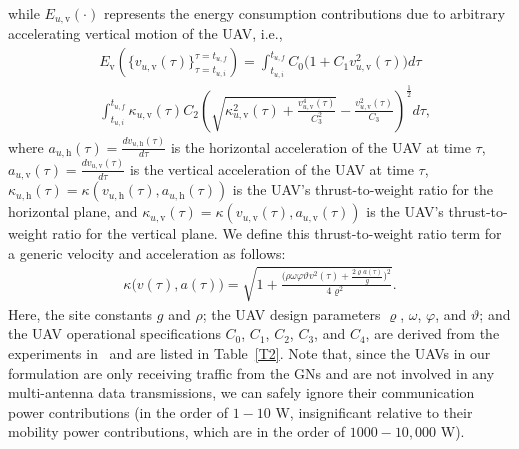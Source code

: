 \documentclass[10pt, twocolumn]{IEEEtran}
\begin{document}
while $E_{u,\mathrm{v}}({\cdot})$ represents the energy consumption contributions due to arbitrary accelerating vertical motion of the UAV, i.e.,
\begin{align}\label{Vertical_energy}
    &E_{\mathrm{v}}\left(\Big\{v_{u,\mathrm{v}}(\tau)\Big\}_{\tau{=}t_{u,i}}^{\tau{=}t_{u,f}}\right){=}\int_{t_{u,i}}^{t_{u,f}}C_{0}\Big(1 + C_{1}v_{u,\mathrm{v}}^{2}(\tau)\Big)d\tau\\&\int_{t_{u,i}}^{t_{u,f}}\kappa_{u,\mathrm{v}}(\tau)C_{2}\left(\sqrt{\kappa_{u,\mathrm{v}}^{2}(\tau){+}\frac{v_{u,\mathrm{v}}^{4}(\tau)}{C_{3}^{2}}}{-}\frac{v_{u,\mathrm{v}}^{2}(\tau)}{C_{3}}\right)^{\frac{1}{2}}d\tau\nonumber,
\end{align}
where $a_{u,\mathrm{h}}(\tau){=}\frac{dv_{u,\mathrm{h}}(\tau)}{d\tau}$ is the horizontal acceleration of the UAV at time $\tau$, $a_{u,\mathrm{v}}(\tau){=}\frac{dv_{u,\mathrm{v}}(\tau)}{d\tau}$ is the vertical acceleration of the UAV at time $\tau$, $\kappa_{u,\mathrm{h}}(\tau){=}\kappa\left(v_{u,\mathrm{h}}(\tau),a_{u,\mathrm{h}}(\tau)\right)$ is the UAV's thrust-to-weight ratio for the horizontal plane, and $\kappa_{u,\mathrm{v}}(\tau){=}\kappa\left(v_{u,\mathrm{v}}(\tau),a_{u,\mathrm{v}}(\tau)\right)$ is the UAV's thrust-to-weight ratio for the vertical plane. We define this thrust-to-weight ratio term for a generic velocity and acceleration as follows:
\vspace{1.319mm}
\begin{align}\label{Kappa_term}
    \kappa\Big(v(\tau),a(\tau)\Big) = \sqrt{1 + \frac{\Big(\rho\omega\varphi\vartheta v^{2}(\tau) + \frac{2\varrho a(\tau)}{g}\Big)^{2}}{4\varrho^{2}}}.
\end{align}
Here, the site constants $g$ and $\rho$; the UAV design parameters $\varrho$, $\omega$, $\varphi$, and $\vartheta$; and the UAV operational specifications $C_{0}$, $C_{1}$, $C_{2}$, $C_{3}$, and $C_{4}$, are derived from the experiments in~\cite{UAV_Propulsion_1} and are listed in Table~\ref{T2}. Note that, since the UAVs in our formulation are only receiving traffic from the GNs and are not involved in any multi-antenna data transmissions, we can safely ignore their communication power contributions (in the order of $1{-}10$ W, insignificant relative to their mobility power contributions, which are in the order of $1000{-}10{,}000$ W).
\vspace{-3mm}

\end{document}
